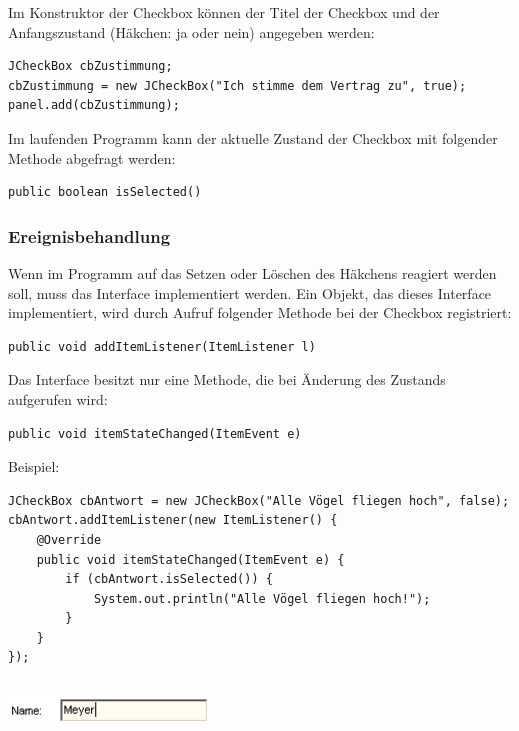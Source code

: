 Im Konstruktor der Checkbox können der Titel der Checkbox und der
Anfangszustand (Häkchen: ja oder nein) angegeben werden:

\begin{lstlisting}
JCheckBox cbZustimmung;
cbZustimmung = new JCheckBox("Ich stimme dem Vertrag zu", true);
panel.add(cbZustimmung);
\end{lstlisting}

Im laufenden Programm kann der aktuelle Zustand der Checkbox mit folgender
Methode abgefragt werden:

\begin{lstlisting}
public boolean isSelected()
\end{lstlisting}

\subsubsection{Ereignisbehandlung}

Wenn im Programm auf das Setzen oder Löschen des Häkchens reagiert werden soll,
muss das Interface  implementiert werden. Ein Objekt, das
dieses Interface implementiert, wird durch Aufruf folgender Methode bei der
Checkbox registriert:

\begin{lstlisting}
public void addItemListener(ItemListener l)
\end{lstlisting}

Das Interface  besitzt nur eine Methode, die bei Änderung
des Zustands aufgerufen wird:

\begin{lstlisting}
public void itemStateChanged(ItemEvent e)
\end{lstlisting}

Beispiel:

\begin{lstlisting}
JCheckBox cbAntwort = new JCheckBox("Alle Vögel fliegen hoch", false);
cbAntwort.addItemListener(new ItemListener() {
    @Override
    public void itemStateChanged(ItemEvent e) {
        if (cbAntwort.isSelected()) {
            System.out.println("Alle Vögel fliegen hoch!");
        }
    }
});
\end{lstlisting}

\begin{minipage}{0.2\textwidth}
\subsection{}
\end{minipage}
\begin{minipage}{0.8\textwidth}
\includegraphics[width=0.4\textwidth]{./inf/SEKII/24_Java_GUI-Komponenten/JTextField.png}
\end{minipage}


